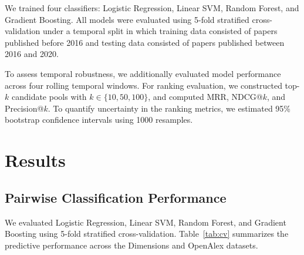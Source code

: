 \documentclass[11pt,a4paper]{article}
\begin{document}
We trained four classifiers: Logistic Regression, Linear SVM, Random Forest, and Gradient Boosting. All models were evaluated using 5-fold stratified cross-validation under a temporal split in which training data consisted of papers published before 2016 and testing data consisted of papers published between 2016 and 2020.

To assess temporal robustness, we additionally evaluated model performance across four rolling temporal windows. For ranking evaluation, we constructed top-\(k\) candidate pools with \(k \in \{10,50,100\}\), and computed MRR, NDCG@\(k\), and Precision@\(k\). To quantify uncertainty in the ranking metrics, we estimated 95\% bootstrap confidence intervals using 1000 resamples.

\section{Results}
\label{sec:results}

\subsection{Pairwise Classification Performance}

We evaluated Logistic Regression, Linear SVM, Random Forest, and Gradient Boosting using 5-fold stratified cross-validation. Table~\ref{tab:cv} summarizes the predictive performance across the Dimensions and OpenAlex datasets.
\end{document}
